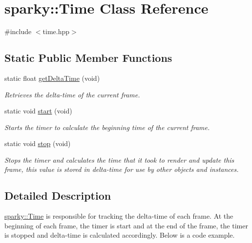 \hypertarget{classsparky_1_1_time}{}\section{sparky\+:\+:Time Class Reference}
\label{classsparky_1_1_time}


{\ttfamily \#include $<$time.\+hpp$>$}

\subsection*{Static Public Member Functions}
\begin{DoxyCompactItemize}
\item 
static float \hyperlink{classsparky_1_1_time_af216f91f65a7631ee3e1974a244f697b}{get\+Delta\+Time} (void)
\begin{DoxyCompactList}\small\item\em Retrieves the delta-\/time of the current frame. \end{DoxyCompactList}\item 
static void \hyperlink{classsparky_1_1_time_a9b56a371f5e1dda4fd9ee32c71d5855a}{start} (void)\hypertarget{classsparky_1_1_time_a9b56a371f5e1dda4fd9ee32c71d5855a}{}\label{classsparky_1_1_time_a9b56a371f5e1dda4fd9ee32c71d5855a}

\begin{DoxyCompactList}\small\item\em Starts the timer to calculate the beginning time of the current frame. \end{DoxyCompactList}\item 
static void \hyperlink{classsparky_1_1_time_acc429e19f42da5dee935a1d54d40ef8f}{stop} (void)\hypertarget{classsparky_1_1_time_acc429e19f42da5dee935a1d54d40ef8f}{}\label{classsparky_1_1_time_acc429e19f42da5dee935a1d54d40ef8f}

\begin{DoxyCompactList}\small\item\em Stops the timer and calculates the time that it took to render and update this frame, this value is stored in delta-\/time for use by other objects and instances. \end{DoxyCompactList}\end{DoxyCompactItemize}


\subsection{Detailed Description}
\hyperlink{classsparky_1_1_time}{sparky\+::\+Time} is responsible for tracking the delta-\/time of each frame. At the beginning of each frame, the timer is start and at the end of the frame, the timer is stopped and delta-\/time is calculated accordingly. Below is a code example.

